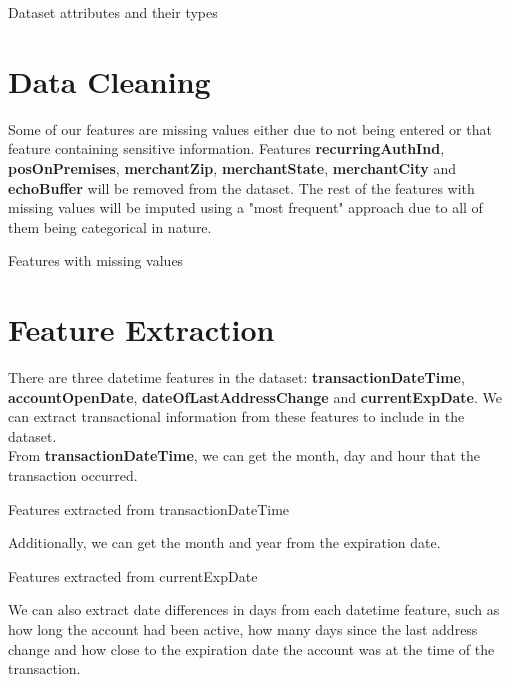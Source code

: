 \documentclass[12pt]{article}
\begin{document}
\begin{table}[h!]
    \centering
    
    
    \caption{Dataset attributes and their types}
    \label{tab:dtypes}
\end{table}

\section{Data Cleaning}
Some of our features are missing values either due to not being entered or that feature containing sensitive information. Features  \textbf{recurringAuthInd}, \textbf{posOnPremises}, \textbf{merchantZip}, \textbf{merchantState}, \textbf{merchantCity} and \textbf{echoBuffer} will be removed from the dataset. The rest of the features with missing values will be imputed using a "most frequent" approach due to all of them being categorical in nature.
\begin{table}[h]
    \centering
    
    \caption{Features with missing values}
    \label{tab:missing}
\end{table}
\newpage
\section{Feature Extraction}
There are three datetime features in the dataset: \textbf{transactionDateTime}, \textbf{accountOpenDate}, \textbf{dateOfLastAddressChange} and \textbf{currentExpDate}. We can extract transactional information from these features to include in the dataset.\\

\noindent From \textbf{transactionDateTime}, we can get the month, day and hour that the transaction occurred.
\begin{table}[h]
    \centering
    
    \caption{Features extracted from transactionDateTime}
    \label{tab:my_label}
\end{table}

\noindent Additionally, we can get the month and year from the expiration date.
\begin{table}[h]
    \centering
    
    \caption{Features extracted from currentExpDate}
    \label{tab:my_label}
\end{table}

\newpage
We can also extract date differences in days from each datetime feature, such as how long the account had been active, how many days since the last address change and how close to the expiration date the account was at the time of the transaction.
\end{document}
